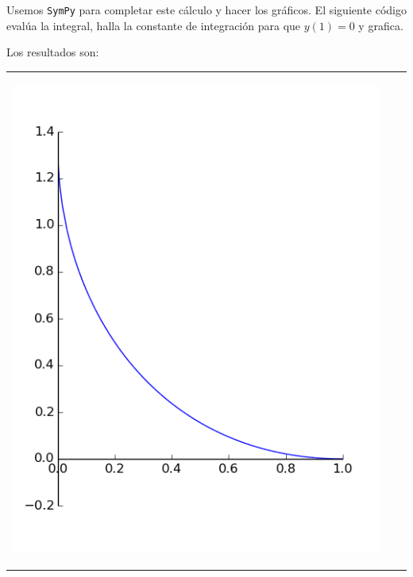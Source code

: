 Usemos \texttt{SymPy} para completar este cálculo y hacer los gráficos. El siguiente código evalúa la integral, halla la constante de integración para que $y(1)=0$ y grafica.



Los resultados son:

\begin{tabular}{m{4cm} m{4cm} m{4cm}}
\begin{center}
\includegraphics[scale=.3]{imagenes/perse_a_1_b_2.png}


\end{center}
\end{tabular}
